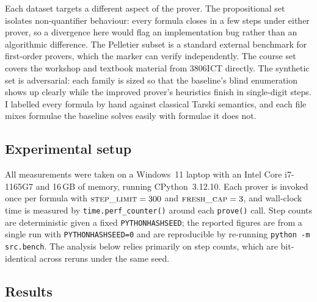 \documentclass[runningheads]{llncs}
\begin{document}
Each dataset targets a different aspect of the prover. The
propositional set isolates non-quantifier behaviour: every formula
closes in a few steps under either prover, so a divergence here would
flag an implementation bug rather than an algorithmic difference.
The Pelletier subset is a standard external benchmark for first-order
provers, which the marker can verify independently. The course set
covers the workshop and textbook material from 3806ICT directly.
The synthetic set is adversarial: each family is sized so that the
baseline's blind enumeration shows up clearly while the improved
prover's heuristics finish in single-digit steps. I labelled every
formula by hand against classical Tarski semantics, and each file
mixes formulae the baseline solves easily with formulae it does not.

\subsection{Experimental setup}
\label{sec:setup}


All measurements were taken on a Windows~11 laptop with an Intel Core
i7-1165G7 and 16\,GB of memory, running CPython~3.12.10. Each prover is
invoked once per formula with $\textsc{step\_limit}=300$ and
$\textsc{fresh\_cap}=3$, and wall-clock time is measured by
\texttt{time.perf\_counter()} around each \texttt{prove()} call. Step
counts are deterministic given a fixed \texttt{PYTHONHASHSEED}; the
reported figures are from a single run with \texttt{PYTHONHASHSEED=0}
and are reproducible by re-running \texttt{python -m src.bench}. The
analysis below relies primarily on step counts, which are bit-identical
across reruns under the same seed.

\subsection{Results}
\label{sec:results}
\end{document}
